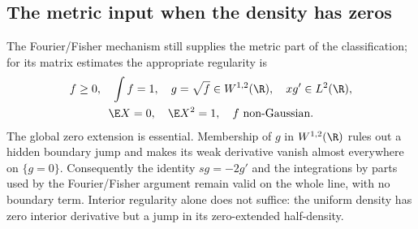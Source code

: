 \subsection{The metric input when the density has zeros}
\label{sec:metric-input-with-density-zeros}

The Fourier/Fisher mechanism still supplies the metric part of the
classification; for its matrix estimates the appropriate regularity is
\begin{equation}
 \begin{gathered}
 f\geq0,\quad \int f=1,\quad
 g=\sqrt f\in W^{1,2}(\R),\quad xg'\in L^2(\R),\\
 \E X=0,\quad \E X^2=1,\quad f\text{ non-Gaussian}.
 \end{gathered}
 \label{eq:zero-set-row-assumptions}
\end{equation}
The global zero extension is essential.  Membership of \(g\) in
\(W^{1,2}(\R)\) rules out a hidden boundary jump and makes its weak derivative
vanish almost everywhere on \(\{g=0\}\).  Consequently the identity
\(sg=-2g'\) and the integrations by parts used by the Fourier/Fisher argument
remain valid on the whole line, with no boundary term.  Interior regularity
alone does not suffice: the uniform density has zero interior derivative but a
jump in its zero-extended half-density.

